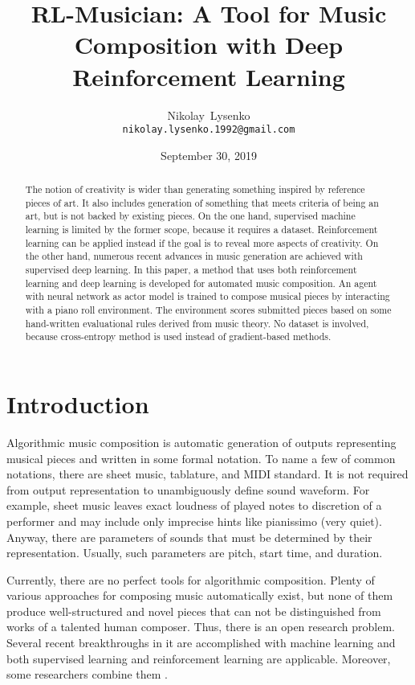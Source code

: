 \documentclass{article}
\title{RL-Musician: A Tool for Music Composition with Deep Reinforcement Learning}
\date{September 30, 2019}
\author{
  Nikolay~Lysenko\\
  \texttt{nikolay.lysenko.1992@gmail.com} \\
}
\begin{document}
\maketitle

\begin{abstract}
The notion of creativity is wider than generating something inspired by reference pieces of art. It also includes generation of something that meets criteria of being an art, but is not backed by existing pieces. On the one hand, supervised machine learning is limited by the former scope, because it requires a dataset. Reinforcement learning can be applied instead if the goal is to reveal more aspects of creativity. On the other hand, numerous recent advances in music generation are achieved with supervised deep learning. In this paper, a method that uses both reinforcement learning and deep learning is developed for automated music composition. An agent with neural network as actor model is trained to compose musical pieces by interacting with a piano roll environment. The environment scores submitted pieces based on some hand-written evaluational rules derived from music theory. No dataset is involved, because cross-entropy method is used instead of gradient-based methods.
\end{abstract}



\section{Introduction}
\label{sec:introduction}

Algorithmic music composition is automatic generation of outputs representing musical pieces and written in some formal notation. To name a few of common notations, there are sheet music, tablature, and MIDI standard. It is not required from output representation to unambiguously define sound waveform. For example, sheet music leaves exact loudness of played notes to discretion of a performer and may include only imprecise hints like pianissimo (very quiet). Anyway, there are parameters of sounds that must be determined by their representation. Usually, such parameters are pitch, start time, and duration.

Currently, there are no perfect tools for algorithmic composition. Plenty of various approaches for composing music automatically exist, but none of them produce well-structured and novel pieces that can not be distinguished from works of a talented human composer. Thus, there is an open research problem. Several recent breakthroughs in it are accomplished with machine learning and both supervised learning \cite{johnson2017generating} and reinforcement learning \cite{smith2012reinforcement} are applicable. Moreover, some researchers combine them \cite{jaques2016generating}.
\end{document}
